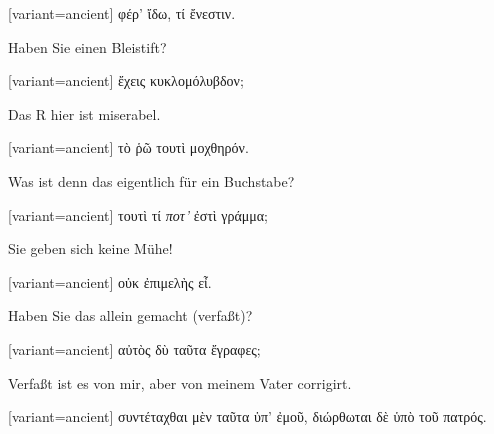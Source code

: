 \switchcolumn

\begin{greek}[variant=ancient]%
φέρ' ἴδω, τί ἔνεστιν.

\end{greek}%
\switchcolumn*

Haben Sie einen Bleistift?

\switchcolumn

\begin{greek}[variant=ancient]%
ἔχεις κυκλομόλυβδον;

\end{greek}%
\switchcolumn*

Das R hier ist miserabel.

\switchcolumn

\begin{greek}[variant=ancient]%
τὸ ῥῶ τουτὶ μοχθηρόν.

\end{greek}%
\switchcolumn*

Was ist denn das eigentlich für ein Buchstabe?

\switchcolumn

\begin{greek}[variant=ancient]%
τουτὶ τί \emph{ποτ'} ἐστὶ γράμμα;

\end{greek}%
\switchcolumn*

Sie geben sich keine Mühe!

\switchcolumn

\begin{greek}[variant=ancient]%
οὐκ ἐπιμελὴς εἶ.

\end{greek}%
\switchcolumn*

Haben Sie das allein gemacht (verfaßt)?

\switchcolumn

\begin{greek}[variant=ancient]%
αὐτὸς δὺ ταῦτα ἔγραφες;

\end{greek}%
\switchcolumn*

Verfaßt ist es von mir, aber von meinem Vater corrigirt.

\switchcolumn

\begin{greek}[variant=ancient]%
συντέταχθαι μὲν ταῦτα ὑπ' ἐμοῦ, διώρθωται δὲ ὑπὸ τοῦ πατρός.

\end{greek}%
\switchcolumn*

